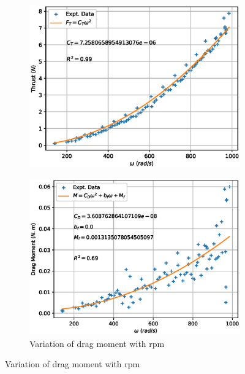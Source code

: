 \begin{figure}[H]
    \begin{minipage}{0.49\textwidth}
        \begin{figure}[H]
            \centering
            \includegraphics[width = \textwidth]{./figs/aero/Thrust_curve.eps}
        \end{figure}
        \caption{Variation of thrust with rpm}
    \end{minipage}
    \begin{minipage}{0.49\textwidth}
        \begin{figure}[H]
            \centering
            \includegraphics[width = \textwidth]{./figs/aero/Drag_curve.eps}
            \caption{Variation of drag moment with rpm}
        \end{figure}
    \end{minipage}
\end{figure}

